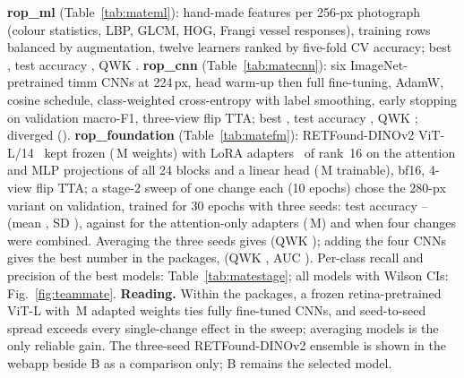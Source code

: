 \documentclass[conference]{IEEEtran}
\begin{document}
\textbf{rop\_ml} (Table~\ref{tab:mateml}): \mateMLFeat{} hand-made features per 256-px photograph (colour statistics, LBP, GLCM, HOG, Frangi vessel responses), training rows balanced by augmentation, twelve learners ranked by five-fold CV accuracy; best \mateMLBest{}, test accuracy \mateMLAcc{}, QWK \mateMLQ{}. \textbf{rop\_cnn} (Table~\ref{tab:matecnn}): six ImageNet-pretrained timm CNNs at 224\,px, head warm-up then full fine-tuning, AdamW, cosine schedule, class-weighted cross-entropy with label smoothing, early stopping on validation macro-F1, three-view flip TTA; best \mateCNNBest{}, test accuracy \mateCNNAcc{}, QWK \mateCNNQ{}; \mateCNNDiverged{} diverged (\mateCNNDivergedAcc{}). \textbf{rop\_foundation} (Table~\ref{tab:matefm}): RETFound-DINOv2 ViT-L/14~\cite{zhou2023} kept frozen (\mateFMtotal{}\,M weights) with LoRA adapters~\cite{hu2022} of rank~16 on the attention and MLP projections of all 24 blocks and a linear head (\mateFMtrainable{}\,M trainable), bf16, 4-view flip TTA; a stage-2 sweep of one change each (10 epochs) chose the 280-px variant on validation, trained for 30 epochs with three seeds: test accuracy \mateFMlo{}--\mateFMhi{} (mean \mateFMmean{}, SD \mateFMsd{}), against \mateFMbaseAcc{} for the attention-only adapters (\mateFMbaseTrainable{}\,M) and \mateFMcomboAcc{} when four changes were combined. Averaging the three seeds gives \mateEnsAcc{} (QWK \mateEnsQ{}); adding the four CNNs gives the best number in the packages, \mateBestAcc{} \mateBestAccci{} (QWK \mateBestQ{}, AUC \mateBestAUC{}). Per-class recall and precision of the best models: Table~\ref{tab:matestage}; all \nMateSeries{} models with Wilson CIs: Fig.~\ref{fig:teammate}. \textbf{Reading.} Within the packages, a frozen retina-pretrained ViT-L with \mateFMtrainable{}\,M adapted weights ties fully fine-tuned CNNs, and seed-to-seed spread exceeds every single-change effect in the sweep; averaging models is the only reliable gain. The three-seed RETFound-DINOv2 ensemble is shown in the webapp beside B as a comparison only; B remains the selected model.

\begin{table}[!t]
\caption{Teammate packages: their photo-level split against this project's splits, by file name (\mateMatched{} of \mateN{} matched). ``Elsewhere'': renamed copies not matched. Last column: validation/test photographs whose infant also has photographs in their training set (matched photographs only).}
\label{tab:matedata}
\centering\scriptsize\setlength{\tabcolsep}{4pt}

\end{table}
\end{document}

